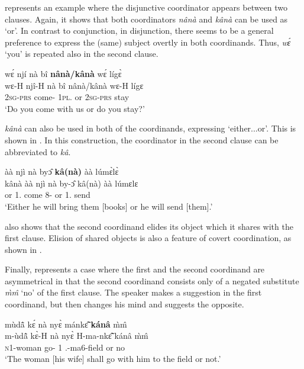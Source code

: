  represents an example where the disjunctive coordinator appears between two clauses. Again, it shows that both coordinators {\itshape nânà} and {\itshape kânà} can be used as `or'. In contrast to conjunction, in disjunction, there seems to be a general preference to express the (same) subject overtly in both coordinands. Thus, {\itshape wɛ́} `you' is repeated also in the second clause.


\ea\label{or1}
  \glll     wɛ́ njí nà bî {\bfseries nânà/kânà} wɛ́ lígɛ̀ \\
             wɛ-H njî-H nà bî nânà/kânà  wɛ-H lígɛ \\
               2\textsc{sg}-\textsc{prs} come-{\R} {\COM} 1\textsc{pl}.{\OBJ} or 2\textsc{sg}-\textsc{prs} stay \\
    \trans `Do you come with us or do you stay?'
\z

{\itshape kânà} can also be used in both of the coordinands, expressing `either...or'. This is shown in . In this construction, the coordinator in the second clause can be abbreviated to {\itshape kâ}.


\ea \label{or2}
   àà njì nà byɔ̂ {\bfseries kâ(nà)} àà lúmɛ̀lɛ̀ \\
             kânà àà njì nà by-ɔ̂ kâ(nà) àà lúmɛlɛ \\
               or 1.{\FUT} come {\COM} 8-{\OBJ} or 1.{\FUT} send\\
    \trans `Either he will bring them [books] or he will send [them].'
\z

\noindent {} also shows that the second coordinand elides its object which it shares with the first clause. Elision of shared objects is also a feature of covert coordination, as shown in .

Finally,  represents a case where the first and the second coordinand are asymmetrical in that the second coordinand consists only of a negated substitute {\itshape m̀m̂} `no' of the first clause. The speaker makes a suggestion in the first coordinand, but then changes his mind and suggests the opposite.


\ea\label{or3}
  \glll mùdã̂ kɛ́ nà nyɛ̀ mánkɛ̃̂ {\bfseries kánâ} m̀m̂ \\
       m-ùdã̂ kɛ̀-H nà nyɛ̀ H-ma-nkɛ̃̂ kánâ m̀m̂ \\
         \textsc{n}1-woman go-{\R} {\COM} 1 {\OBJ}.{\LINK}-ma6-field or no  \\
    \trans `The woman [his wife] shall go with him to the field or not.'
\z





